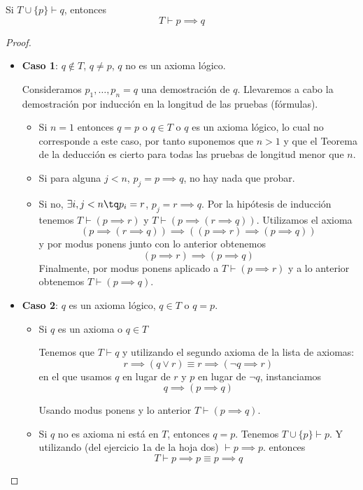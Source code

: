 \begin{theorem}
	Si $T\cup\{p\}\vdash q$, entonces $$T\vdash p\implies q$$
\end{theorem}
\begin{proof}
	\begin{itemize}
		\item \textbf{Caso 1}: $q\notin T$, $q\neq p$, $q$ no es un axioma lógico.

		Consideramos $p_1,\hdots, p_n=q$ una demostración de $q$. Llevaremos a cabo la demostración por inducción en la longitud de las pruebas (fórmulas).

		\begin{itemize}
			\item Si $n=1$ entonces $q=p$ o $q\in T$ o $q$ es un axioma lógico, lo cual no corresponde a este caso, por tanto suponemos que $n>1$ y que el Teorema de la deducción es cierto para todas las pruebas de longitud menor que $n$.
			\item Si para alguna $j<n$, $p_j = p\implies q$, no hay nada que probar.
			\item Si no, $\exists i,j<n \tq p_i=r$, $p_j=r\implies q$. Por la hipótesis de inducción tenemos $T\vdash (p\implies r)$ y $T\vdash (p\implies (r\implies q))$.
			Utilizamos el axioma
			$$(p\implies (r\implies q)) \implies ((p\implies r)\implies (p\implies q))$$
			y por modus ponens junto con lo anterior obtenemos
			$$(p\implies r)\implies (p\implies q)$$
			Finalmente, por modus ponens aplicado a $T\vdash (p\implies r)$ y a lo anterior obtenemos $T\vdash (p\implies q)$.
		\end{itemize}
	\item \textbf{Caso 2}: $q$ es un axioma lógico, $q\in T$ o $q=p$.

	\begin{itemize}
		\item Si $q$ es un axioma o $q\in T$

		Tenemos que $T\vdash q$ y utilizando el segundo axioma de la lista de axiomas:
		$$r\implies (q \vee r) \equiv r\implies (\neg q \implies r)$$ en el que usamos $q$ en lugar de $r$ y $p$ en lugar de $\neg q$, instanciamos
		$$q\implies(p\implies q)$$

		Usando modus ponens y lo anterior
		$T\vdash (p\implies q)$.

		\item Si $q$ no es axioma ni está en $T$, entonces $q = p$.
		Tenemos $T\cup\{p\}\vdash p$.
		Y utilizando (del ejercicio 1a de la hoja dos) $\vdash p\implies p$.
		entonces $$T\vdash p\implies p \equiv p\implies q$$
	\end{itemize}
	\end{itemize}
\end{proof}

